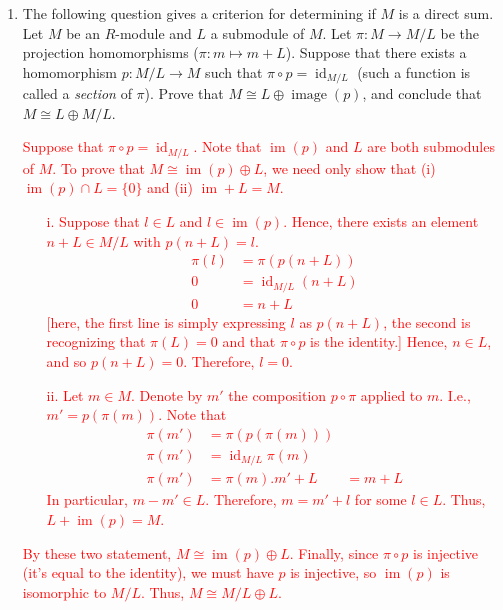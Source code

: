 \documentclass[12pt]{article}
\newcommand{\im}{\operatorname{im}}
\newcommand{\solution}[1]{\textcolor{red}{#1}}
\begin{document}
\pagestyle{fancy}


\begin{enumerate}
\item The following question gives a criterion for determining if $M$
  is a direct sum. Let $M$ be an $R$-module and $L$ a
  submodule of $M$. Let $\pi: M\rightarrow M/L$ be the projection
  homomorphisms ($\pi: m\mapsto m+L$). Suppose that there exists a
  homomorphism $p: M/L \rightarrow M$ such that $\pi \circ p=\operatorname{id}_{M/L}$ (such a function is called a
  \emph{section} of $\pi$). Prove that $M \cong L\oplus
  \operatorname{image}(p)$, and conclude that $M\cong L\oplus M/L$. 
\solution{
Suppose that $\pi \circ p = \operatorname{id}_{M/L}$. Note that
$\im(p)$ and $L$ are both submodules of $M$. To prove that $M\cong
\im(p)\oplus L$, we need only show that (i) $\im(p)\cap L =\{0\}$ and
(ii) $\im+L = M$.
\begin{itemize}
\item[i.] Suppose that $l\in L$ and $l\in \im(p)$. Hence, there exists
  an element $n+L\in M/L$ with $p(n+L) = l$.
  \begin{align*}
    \pi(l) &= \pi(p(n+L))\\
0 & = \operatorname{id}_{M/L}(n+L)\\
0 &= n+L
  \end{align*}
[here, the first line is simply expressing $l$ as $p(n+L)$, the second
is recognizing that $\pi(L)=0$ and that $\pi\circ p$ is the identity.]
Hence, $n\in L$, and so $p(n+L)=0$. Therefore, $l=0$. 
\item[ii.] Let $m\in M$. Denote by $m'$ the composition $p\circ \pi$
  applied to $m$. I.e., $m'=p(\pi(m))$. Note that
  \begin{align*}
    \pi(m') &= \pi (p(\pi(m)))\\
\pi(m') &= \operatorname{id}_{M/L} \pi(m)\\
\pi(m')&= \pi(m).
m' + L &= m+L
  \end{align*}
In particular, $m-m'\in L$. Therefore, $m=m'+l$ for some $l\in
L$. Thus, $L+\im(p)=M$. 
\end{itemize}
By these two statement, $M\cong \im(p)\oplus L$. Finally, since $\pi \circ p$
is injective (it's equal to the identity), we must have $p$ is
injective, so $\im(p)$ is isomorphic to $M/L$. Thus, $M\cong M/L
\oplus L$.}


\end{enumerate}
\end{document}
